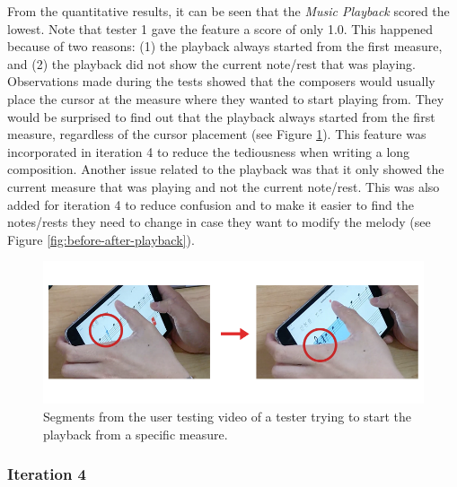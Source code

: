 				From the quantitative results, it can be seen that the \textit{Music Playback} scored the lowest. Note that tester 1 gave the feature a score of only 1.0. This happened because of two reasons: (1) the playback always started from the first measure, and (2) the playback did not show the current note/rest that was playing. Observations made during the tests showed that the composers would usually place the cursor at the measure where they wanted to start playing from. They would be surprised to find out that the playback always started from the first measure, regardless of the cursor placement (see Figure \ref{fig:video_musicplayback}). This feature was incorporated in iteration 4 to reduce the tediousness when writing a long composition. Another issue related to the playback was that it only showed the current measure that was playing and not the current note/rest. This was also added for iteration 4 to reduce confusion and to make it easier to find the notes/rests they need to change in case they want to modify the melody (see Figure \ref{fig:before-after-playback}). 

				\begin{figure}[H]
					\centering
					\includegraphics[scale=0.5]{figures/video_musicplayback.png}
				    \caption{Segments from the user testing video of a tester trying to start the playback from a specific measure.}
				    \label{fig:video_musicplayback}
				\end{figure}

			\subsubsection{Iteration 4} %
			\label{sub:iteration_4}

